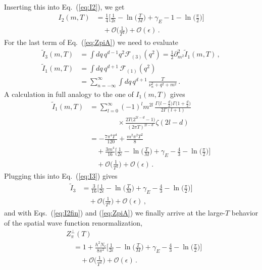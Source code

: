 \documentclass[reprint,english,superscriptaddress,preprintnumbers,amsmath,amssymb,aps,prd]{revtex4-2}
\def\eq#1{(\ref{#1})}
\def\Eq#1{Eq.~(\ref{#1})}
\begin{document}
Inserting this into \Eq{eq:I2}, we get
\begin{align}
   I_2(m,T) &=  \frac{1}{4}\bigg[\frac{1}{2\epsilon}-\ln\bigg(\frac{T}{M}\bigg) + \gamma_E -1 -\ln\bigg(\!\frac{\pi}{2}\!\bigg)  \bigg]\nonumber\\[2ex]
   &\quad+ \mathcal{O}\bigg(\frac{1}{T^2}\bigg)+ \mathcal{O}(\epsilon)\,.
   \label{eq:I2fin}
\end{align}
For the last term of \Eq{eq:ZpiA} we need to evaluate
\begin{align}
 \tilde I_3(m,T) &= \int\! dq\,q^{d-1} q^2\mathcal{F}_{(3)}(q^2) =  \frac{1}{2}\partial_{m^2}^2 \tilde I_1(m,T)\,,\nonumber\\[2ex]
    \tilde I_1(m,T) &= \int\!dq\,q^{d+1}\,\mathcal{F}_{(1)}(q^2)\nonumber\\[2ex]
    &= \sum_{n=-\infty}^\infty \int\!dq\,q^{d+1}\, \frac{T}{\nu_n^2+q^2+m^2}\,.
    \label{eq:I3}
\end{align}
A calculation in full analogy to the one of $I_1(m,T)$ gives
\begin{align}
   \tilde I_1(m,T) &=
   \sum_{l=0}^\infty (-1)^l m^{2l}\, \frac{\Gamma\big(l\!-\!\frac{d}{2}\big)\Gamma\big(1+\frac{d}{2}\big)}{2 \Gamma(l+1)}\nonumber\\[2ex]
  &\quad\phantom{\sum_{l=0}^\infty}\times\frac{2 T \big(2^{2l-d}-1\big)}{(2\pi T)^{2l-d}}\zeta(2l-d)\nonumber\\[2ex]
   &=-\frac{7\pi^4 T^4}{120} + \frac{m^2 \pi^2 T^2}{8}\nonumber\\[2ex]
   &\quad+\frac{3 m^4}{16}\bigg[\frac{1}{2\epsilon}-\ln\bigg(\frac{T}{M}\bigg) + \gamma_E -\frac{4}{3} -\ln\bigg(\!\frac{\pi}{2}\!\bigg)  \bigg]\nonumber\\[2ex]
   &\quad+ \mathcal{O}\bigg(\frac{1}{T^2}\bigg)+ \mathcal{O}(\epsilon)\,.
\end{align}
Plugging this into \Eq{eq:I3} gives
\begin{align}
    \tilde I_3 &= \frac{3}{16}\bigg[\frac{1}{2\epsilon}-\ln\bigg(\frac{T}{M}\bigg) + \gamma_E -\frac{4}{3} -\ln\bigg(\!\frac{\pi}{2}\!\bigg)  \bigg]\nonumber\\[2ex]
    &\quad+ \mathcal{O}\bigg(\frac{1}{T^2}\bigg)+ \mathcal{O}(\epsilon)\,,
\end{align}
and with Eqs.\ \eq{eq:I2fin} and \eq{eq:ZpiA} we finally arrive at the large-$T$ behavior of the spatial wave function renormalization,
\begin{align}
    &Z_\pi^\perp(T)\nonumber\\[2ex]
    &\quad = 1 + \frac{h^2 N_c}{8\pi^2} \bigg[\frac{1}{2 \epsilon} - \ln\bigg(\frac{T}{M}\bigg) + \gamma_E - \frac{4}{3} - \ln\bigg(\frac{\pi}{2}\bigg) \bigg]\nonumber\\[2ex]
    &\qquad+ \mathcal{O}\bigg(\frac{1}{T^2}\bigg) + \mathcal{O}(\epsilon)\,.
    \label{eq:ZpilT}
\end{align}
\end{document}

